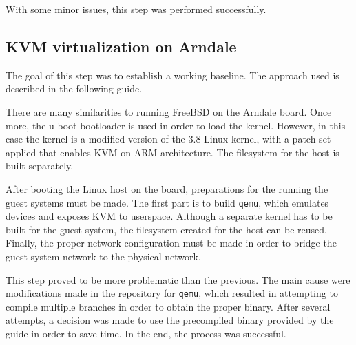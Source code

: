 With some minor issues, this step was performed successfully.

\subsection{KVM virtualization on Arndale}
\label{subsec:kvm-arndale}

The goal of this step was to establish a working baseline.
The approach used is described in the following guide\cite{kvm}.

There are many similarities to running FreeBSD on the Arndale board. Once more, the u-boot bootloader is used in order to load the kernel. However, in this case the kernel is a modified version of the 3.8 Linux kernel, with a patch set applied that enables KVM on ARM architecture. The filesystem for the host is built separately.

After booting the Linux host on the board, preparations for the running the guest systems must be made. The first part is to build \texttt{qemu}, which emulates devices and exposes KVM to userspace. Although a separate kernel has to be built for the guest system, the filesystem created for the host can be reused. Finally, the proper network configuration must be made in order to bridge the guest system network to the physical network.

This step proved to be more problematic than the previous. The main cause were modifications made in the repository for \texttt{qemu}, which resulted in attempting to compile multiple branches in order to obtain the proper binary. After several attempts, a decision was made to use the precompiled binary provided by the guide in order to save time. In the end, the process was successful.
